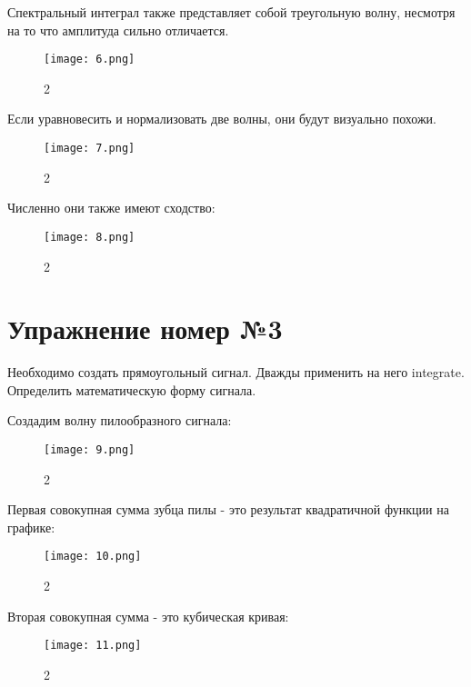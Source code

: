 \documentclass[10pt,a4paper,oneside]{article}
\begin{document}
Спектральный интеграл также представляет собой треугольную волну, несмотря на то что амплитуда сильно отличается.

\begin{figure}[H]
        \centering
        \texttt{[image: 6.png]}
        \caption{2}
        \label{fig:first}
\end{figure}

Если уравновесить и нормализовать две волны, они будут визуально похожи.

\begin{figure}[H]
        \centering
        \texttt{[image: 7.png]}
        \caption{2}
        \label{fig:first}
\end{figure}

Численно они также имеют сходство:

\begin{figure}[H]
        \centering
        \texttt{[image: 8.png]}
        \caption{2}
        \label{fig:first}
\end{figure}

\section{Упражнение номер №3}

Необходимо создать прямоугольный сигнал. Дважды применить на него integrate. Определить математическую форму сигнала. 

Создадим волну пилообразного сигнала:

\begin{figure}[H]
        \centering
        \texttt{[image: 9.png]}
        \caption{2}
        \label{fig:first}
\end{figure}

Первая совокупная сумма зубца пилы - это результат квадратичной функции на графике:

\begin{figure}[H]
        \centering
        \texttt{[image: 10.png]}
        \caption{2}
        \label{fig:first}
\end{figure}

Вторая совокупная сумма - это кубическая кривая:

\begin{figure}[H]
        \centering
        \texttt{[image: 11.png]}
        \caption{2}
        \label{fig:first}
\end{figure}
\end{document}
